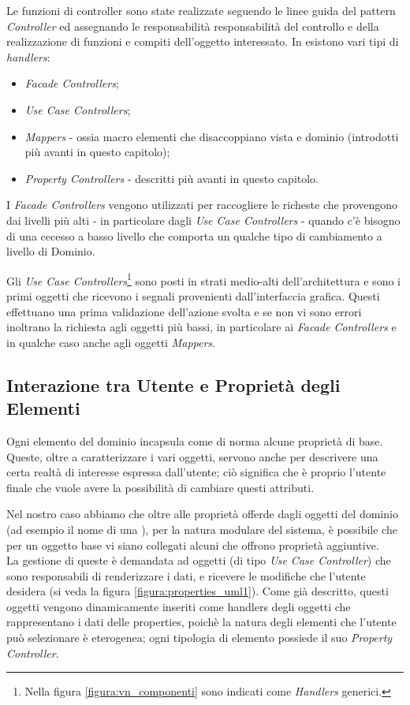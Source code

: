 Le funzioni di controller sono state realizzate seguendo le linee guida del pattern \emph{Controller}\cite{AUPL04} ed assegnando le responsabilità responsabilità del controllo e della realizzazione di funzioni e compiti dell'oggetto interessato. In \visualnetkit{} esistono vari tipi di \emph{handlers}:
\begin{itemize}
\item \emph{Facade Controllers};
\item \emph{Use Case Controllers};
\item \emph{Mappers} - ossia macro elementi che disaccoppiano vista e dominio (introdotti più avanti in questo capitolo);
\item \emph{Property Controllers} - descritti più avanti in questo capitolo.
\end{itemize}

I \emph{Facade Controllers} vengono utilizzati per raccogliere le richeste che provengono dai livelli più alti - in particolare dagli \emph{Use Case Controllers} - quando c'è bisogno di una cecesso a basso livello che comporta un qualche tipo di cambiamento a livello di Dominio.

Gli \emph{Use Case Controllers}\footnote{Nella figura \ref{figura:vn_componenti} sono indicati come \emph{Handlers} generici.} sono posti in strati medio-alti dell'architettura e sono i primi oggetti che ricevono i segnali provenienti dall'interfaccia grafica. Questi effettuano una prima validazione dell'azione svolta e se non vi sono errori inoltrano la richiesta agli oggetti più bassi, in particolare ai \emph{Facade Controllers} e in qualche caso anche agli oggetti \emph{Mappers}.


\subsection{Interazione tra Utente e Proprietà degli Elementi}
Ogni elemento del dominio incapsula come di norma alcune proprietà di base. Queste, oltre a caratterizzare i vari oggetti, servono anche per descrivere una certa realtà di interesse espressa dall'utente; ciò significa che è proprio l'utente finale che vuole avere la possibilità di cambiare questi attributi.

Nel nostro caso abbiamo che oltre alle proprietà offerde dagli oggetti del dominio (ad esempio il nome di una \virtualmachine{}), per la natura modulare del sistema, è possibile che per un oggetto base vi siano collegati alcuni \plugin{} che offrono proprietà aggiuntive.\\
La gestione di queste è demandata ad oggetti (di tipo \emph{Use Case Controller}) che sono responsabili di renderizzare i dati, e ricevere le modifiche che l'utente desidera (si veda la figura \ref{figura:properties_uml1}). Come già descritto, questi oggetti vengono dinamicamente inseriti come handlers degli oggetti che rappresentano i dati delle properties, poichè la natura degli elementi che l'utente può selezionare è eterogenea; ogni tipologia di elemento possiede il suo \emph{Property Controller}.

